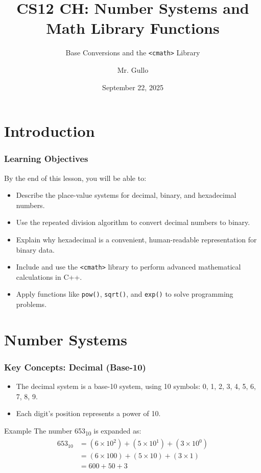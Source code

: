 \documentclass{beamer}
\title[Number Systems and Math]{CS12 CH: Number Systems and Math Library Functions}
\subtitle{Base Conversions and the \texttt{<cmath>} Library}
\author[Mr. Gullo]{Mr. Gullo}
\date[Sep 22, 2025]{September 22, 2025}
\begin{document}
\frame{\titlepage}

\section{Introduction}

\begin{frame}
\frametitle{Learning Objectives}
By the end of this lesson, you will be able to:
\begin{itemize}
    \item Describe the place-value systems for decimal, binary, and hexadecimal numbers.
    \item Use the repeated division algorithm to convert decimal numbers to binary.
    \item Explain why hexadecimal is a convenient, human-readable representation for binary data.
    \item Include and use the \texttt{<cmath>} library to perform advanced mathematical calculations in C++.
    \item Apply functions like \texttt{pow()}, \texttt{sqrt()}, and \texttt{exp()} to solve programming problems.
\end{itemize}
\end{frame}

\section{Number Systems}

\begin{frame}
\frametitle{Key Concepts: Decimal (Base-10)}
\begin{itemize}
    \item The decimal system is a base-10 system, using 10 symbols: 0, 1, 2, 3, 4, 5, 6, 7, 8, 9.
    \item Each digit's position represents a power of 10.
\end{itemize}
\begin{exampleblock}{Example}
The number 653\textsubscript{10} is expanded as:
\begin{align*}
    653_{10} &= (6 \times 10^2) + (5 \times 10^1) + (3 \times 10^0) \\
             &= (6 \times 100) + (5 \times 10) + (3 \times 1) \\
             &= 600 + 50 + 3
\end{align*}
\end{exampleblock}
\end{frame}
\end{document}
